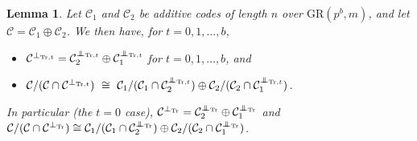 \documentclass{article}
\DeclareMathOperator{\Tr}{Tr}
\newcommand\independent{\protect\mathpalette{\protect\independenT}{\perp}}
\def\independenT#1#2{\mathrel{\rlap{$#1#2$}\mkern3mu{#1#2}}}
\newtheorem{lem}{Lemma}[section]
\theoremstyle{remark}
\theoremstyle{definition}
\numberwithin{equation}{section}
\begin{document}
\begin{lem}
\label{lem:oplus}
Let $\mathcal{C}_1$ and $\mathcal{C}_2$ be additive codes of length $n$ over $\text{GR}(p^b,m)$, and let $\mathcal{C} = \mathcal{C}_1 \oplus \mathcal{C}_2$. We then have, for $t = 0,1,\ldots,b$,
\begin{itemize}
\item[\emph{(a)}] $\mathcal{C}^{\perp_{\Tr,t}} = \mathcal{C}_2^{\independent_{\Tr,t}} \oplus \mathcal{C}_1^{\independent_{\Tr,t}}$ for $t = 0,1,\ldots,b$, and
\item[\emph{(b)}] $\mathcal{C}/(\mathcal{C} \cap \mathcal{C}^{\perp_{\Tr,t}}) \  \cong \ \mathcal{C}_1/ (\mathcal{C}_1 \cap\mathcal{C}_2^{\independent_{\Tr,t}})  \oplus \mathcal{C}_2/(\mathcal{C}_2 \cap \mathcal{C}_1^{\independent_{\Tr,t}})$.
\end{itemize}
In particular (the $t=0$ case), $\mathcal{C}^{\perp_{\Tr}} = \mathcal{C}_2^{\independent_{\Tr}} \oplus \mathcal{C}_1^{\independent_{\Tr}}$ and $\mathcal{C}/(\mathcal{C} \cap \mathcal{C}^{\perp_{\Tr}})  \cong \mathcal{C}_1/ (\mathcal{C}_1 \cap\mathcal{C}_2^{\independent_{\Tr}})  \oplus \mathcal{C}_2/(\mathcal{C}_2 \cap \mathcal{C}_1^{\independent_{\Tr}})$.
\end{lem}
\end{document}
